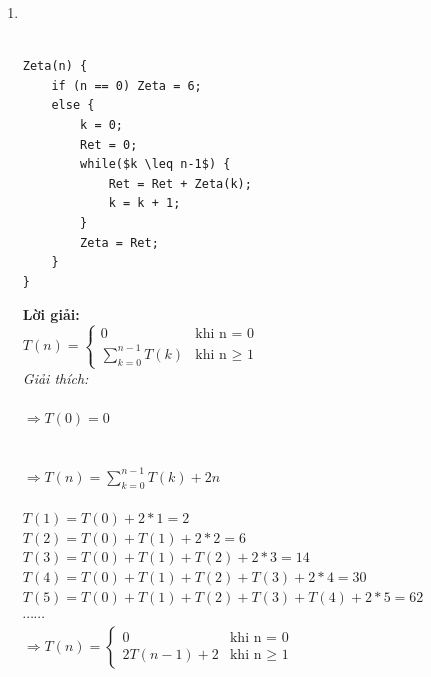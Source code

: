 \documentclass[12pt, letterpaper]{article}
\begin{document}
\begin{enumerate}
	\item
	       \\
	       \\
	      \begin{lstlisting}
Zeta(n) {
    if (n == 0) Zeta = 6;
    else {
        k = 0;
        Ret = 0;
        while($k \leq n-1$) {
            Ret = Ret + Zeta(k);
            k = k + 1;
        }
        Zeta = Ret;
    }
}
    \end{lstlisting}
	      \textbf{Lời giải:} \\
	      $T(n) =
		      \begin{cases}
			      0                     & \text{khi n = 0}      \\
			      \sum_{k=0}^{n-1} T(k) & \text{khi n $\geq$ 1}
		      \end{cases}$ \\
	      \textit{Giải thích:} \\
	       \\
	      $\Rightarrow T(0) = 0$ \\
	       \\
	       \\
	      $\Rightarrow T(n) = \sum_{k=0}^{n-1} T(k) + 2n$ \\

	       \\
	      $T(1) = T(0) + 2*1 = 2$ \\
	      $T(2) = T(0) + T(1) + 2*2 = 6$ \\
	      $T(3) = T(0) + T(1) + T(2) + 2*3 = 14$ \\
	      $T(4) = T(0) + T(1) + T(2) + T(3) + 2*4 = 30$ \\
	      $T(5) = T(0) + T(1) + T(2) + T(3) + T(4) + 2*5 = 62$ \\
	      $\cdots \cdots$ \\
	      $\Rightarrow T(n) =
		      \begin{cases}
			      0           & \text{khi n = 0}      \\
			      2T(n-1) + 2 & \text{khi n $\geq$ 1}
		      \end{cases}$ \\


\end{enumerate}
\end{document}
